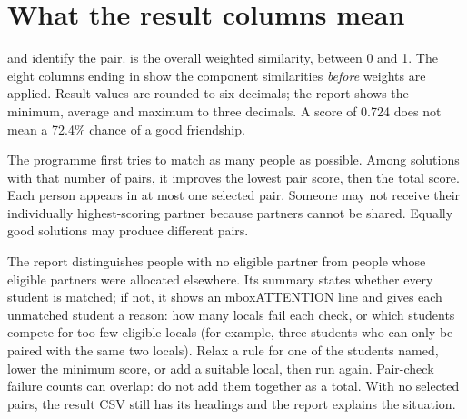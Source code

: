 \documentclass[11pt,a4paper]{article}
\begin{document}
\section*{What the result columns mean}
 and  identify the pair.  is the overall weighted similarity, between 0 and 1. The eight columns ending in  show the component similarities \emph{before} weights are applied. Result values are rounded to six decimals; the report shows the minimum, average and maximum to three decimals. A score of 0.724 does not mean a 72.4\% chance of a good friendship.

The programme first tries to match as many people as possible. Among solutions with that number of pairs, it improves the lowest pair score, then the total score. Each person appears in at most one selected pair. Someone may not receive their individually highest-scoring partner because partners cannot be shared. Equally good solutions may produce different pairs.

The report distinguishes people with no eligible partner from people whose eligible partners were allocated elsewhere. Its summary states whether every student is matched; if not, it shows an mbox{ATTENTION} line and gives each unmatched student a reason: how many locals fail each check, or which students compete for too few eligible locals (for example, three students who can only be paired with the same two locals). Relax a rule for one of the students named, lower the minimum score, or add a suitable local, then run again. Pair-check failure counts can overlap: do not add them together as a total. With no selected pairs, the result CSV still has its headings and the report explains the situation.
\end{document}
